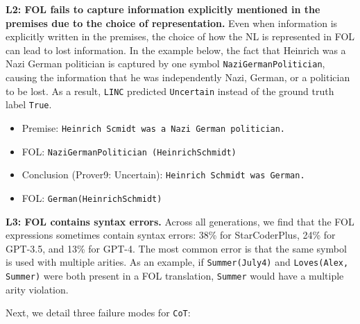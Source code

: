 \documentclass[11pt]{article}
\begin{document}
\textbf{L2: FOL fails to capture information explicitly mentioned in the premises due to the choice of representation.} Even when information is explicitly written in the premises, the choice of how the NL is represented in FOL can lead to lost information. In the example below, the fact that Heinrich was a Nazi German politician is captured by one symbol \texttt{NaziGermanPolitician}, causing the information that he was independently Nazi, German, or a politician to be lost.
As a result, \texttt{LINC} predicted \texttt{Uncertain} instead of the ground truth label \texttt{True}.

\begin{itemize}[leftmargin=*]
    \item[] \small Premise: \texttt{Heinrich Scmidt was a Nazi German politician.}
    \item[] \small FOL: \texttt{NaziGermanPolitician (HeinrichSchmidt)}
    \item[] \small Conclusion (Prover9: Uncertain): \texttt{Heinrich Schmidt was German.}
    \item[] \small FOL: \texttt{German(HeinrichSchmidt)}
\end{itemize}

\textbf{L3: FOL contains syntax errors.}  Across all generations, we find that the FOL expressions sometimes contain syntax errors: 38\% for StarCoderPlus, 24\% for GPT-3.5, and 13\% for GPT-4. The most common error is that the same symbol is used with multiple arities. As an example, if \texttt{Summer(July4)} and \texttt{Loves(Alex, Summer)} were both present in a FOL translation, \texttt{Summer} would have a multiple arity violation.

Next, we detail three failure modes for \texttt{CoT}:
\end{document}
